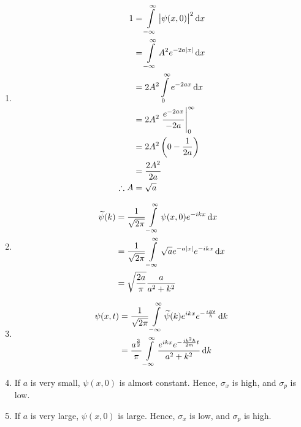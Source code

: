 \documentclass[fleqn, a4paper, 11pt, oneside]{amsart}
\theoremstyle{definition}
\theoremstyle{theorem}
\renewcommand{\tilde}{\widetilde}
\begin{document}
\begin{solution}
	\begin{enumerate}[leftmargin=*]
		\item
			\begin{align*}
				1            & = \int\limits_{-\infty}^{\infty} \left| \psi(x,0) \right|^2 \dif x \\
                                             & = \int\limits_{-\infty}^{\infty} A^2 e^{-2 a |x|} \dif x           \\
                                             & = 2 A^2 \int\limits_{0}^{\infty} e^{-2 a x} \dif x                 \\
                                             & = 2 A^2 \left. \frac{e^{-2 a x}}{-2 a} \right|_{0}^{\infty}        \\
                                             & = 2 A^2 \left( 0 - \frac{1}{2 a} \right)                           \\
                                             & = \frac{2 A^2}{2 a}                                                \\
				\therefore A & = \sqrt{a}
			\end{align*}
		\item
			\begin{align*}
				\tilde{\psi}(k) & = \frac{1}{\sqrt{2 \pi}} \int\limits_{-\infty}^{\infty} \psi(x,0) e^{-i k x} \dif x           \\
                                                & = \frac{1}{\sqrt{2 \pi}} \int\limits_{-\infty}^{\infty} \sqrt{a} e^{-a |x|} e^{-i k x} \dif x \\
                                                & = \sqrt{\frac{2 a}{\pi}} \frac{a}{a^2 + k^2}
			\end{align*}
		\item
			\begin{align*}
				\psi(x,t) & = \frac{1}{\sqrt{2 \pi}} \int\limits_{-\infty}^{\infty} \tilde{\psi}(k) e^{i k x} e^{-\frac{i E t}{\hbar}} \dif k \\
                                          & = \frac{a^{\frac{3}{2}}}{\pi} \int\limits_{-\infty}^{\infty} \frac{e^{i k x} e^{-\frac{i k^2 \hbar}{2 m} t}}{a^2 + k^2} \dif k
			\end{align*}
		\item
			If $a$ is very small, $\psi(x,0)$ is almost constant.
			Hence, $\sigma_x$ is high, and $\sigma_p$ is low.
		\item
			If $a$ is very large, $\psi(x,0)$ is large.
			Hence, $\sigma_x$ is low, and $\sigma_p$ is high.
	\end{enumerate}
\end{solution}
\end{document}
